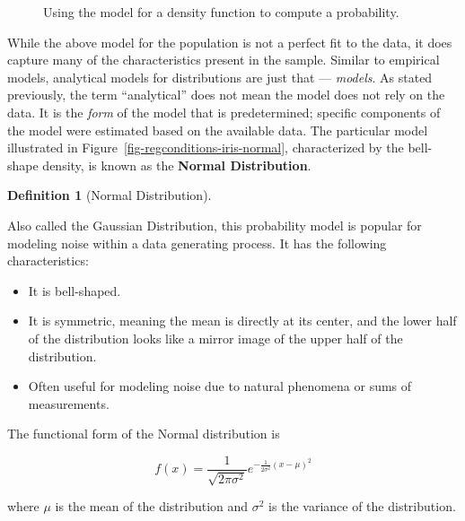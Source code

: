 \documentclass[
  letterpaper,
  DIV=11,
  numbers=noendperiod]{scrreprt}
\providecommand{\tightlist}{%
  \setlength{\itemsep}{0pt}\setlength{\parskip}{0pt}}\usepackage{longtable,booktabs,array}
\theoremstyle{plain}
\theoremstyle{definition}
\theoremstyle{definition}
\newtheorem{definition}{Definition}[chapter]
\theoremstyle{remark}
\begin{document}
\begin{figure}


\caption{\label{fig-regconditions-iris-prob}Using the model for a
density function to compute a probability.}

\end{figure}%

While the above model for the population is not a perfect fit to the
data, it does capture many of the characteristics present in the sample.
Similar to empirical models, analytical models for distributions are
just that --- \emph{models}. As stated previously, the term
``analytical'' does not mean the model does not rely on the data. It is
the \emph{form} of the model that is predetermined; specific components
of the model were estimated based on the available data. The particular
model illustrated in Figure~\ref{fig-regconditions-iris-normal},
characterized by the bell-shape density, is known as the \textbf{Normal
Distribution}.

\begin{definition}[Normal
Distribution]\protect\hypertarget{def-normal-distribution}{}\label{def-normal-distribution}

Also called the Gaussian Distribution, this probability model is popular
for modeling noise within a data generating process. It has the
following characteristics:

\begin{itemize}
\tightlist
\item
  It is bell-shaped.
\item
  It is symmetric, meaning the mean is directly at its center, and the
  lower half of the distribution looks like a mirror image of the upper
  half of the distribution.
\item
  Often useful for modeling noise due to natural phenomena or sums of
  measurements.
\end{itemize}

The functional form of the Normal distribution is

\[f(x) = \frac{1}{\sqrt{2\pi\sigma^2}} e^{-\frac{1}{2\sigma^2}(x - \mu)^2}\]

where \(\mu\) is the mean of the distribution and \(\sigma^2\) is the
variance of the distribution.

\end{definition}
\end{document}
